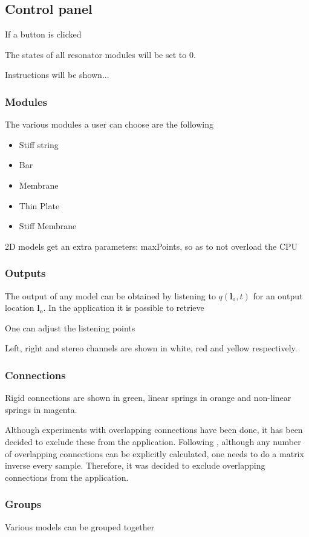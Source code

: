 \documentclass{article}
\begin{document}
\subsection{Control panel}
If a button is clicked

The states of all resonator modules will be set to 0.

Instructions will be shown... 
\subsubsection{Modules}
The various modules a user can choose are the following
\begin{itemize}
    \item Stiff string
    \item Bar
    \item Membrane
    \item Thin Plate
    \item Stiff Membrane
\end{itemize}

2D models get an extra parameters: maxPoints, so as to not overload the CPU 

\subsubsection{Outputs}
The output of any model can be obtained by listening to $q(\boldsymbol{l}_\text{o}, t)$ for an output location $\boldsymbol{l}_\text{o}$. In the application it is possible to retrieve 

One can adjust the listening points 

Left, right and stereo channels are shown in white, red and yellow respectively. 

\subsubsection{Connections}
Rigid connections are shown in green, linear springs in orange and non-linear springs in magenta. 

Although experiments with overlapping connections have been done, it has been decided to exclude these from the application. Following \cite{Bilbao2009Modular}, although any number of overlapping connections can be explicitly calculated, one needs to do a matrix inverse every sample. Therefore, it was decided to exclude overlapping connections from the application. 


\subsubsection{Groups}
Various models can be grouped together
\end{document}
